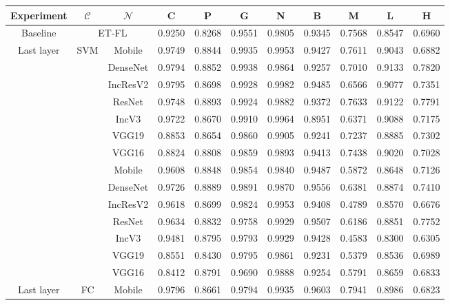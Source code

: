\begin{table}
  \centering
  \scriptsize
	\begin{tabular}{|c|c|c|ccccc|ccc|}
    \hline
    \textbf{Experiment} & $\mathcal{C}$ & $\mathcal{N}$ & \textbf{C} & \textbf{P} & \textbf{G} & \textbf{N} & \textbf{B} & \textbf{M} & \textbf{L} & \textbf{H} \\
    \hline
    Baseline & \multicolumn{2}{c|}{ET-FL} & 0.9250 & 0.8268 & 0.9551 & 0.9805 & 0.9345 & 0.7568 & 0.8547 & 0.6960 \\
    \hline
    \multirow{8}{*}{Last layer} & \multirow{8}{*}{SVM} & Mobile & 0.9749 & 0.8844 & 0.9935 & 0.9953 & 0.9427 & 0.7611 & 0.9043 & 0.6882 \\
    & & DenseNet & 0.9794 & 0.8852 & 0.9938 & 0.9864 & 0.9257 & 0.7010 & 0.9133 & 0.7820 \\
    & & IncResV2 & 0.9795 & 0.8698 & 0.9928 & 0.9982 & 0.9485 & 0.6566 & 0.9077 & 0.7351 \\
    & & ResNet & 0.9748 & 0.8893 & 0.9924 & 0.9882 & 0.9372 & 0.7633 & 0.9122 & 0.7791 \\
    & & IncV3 & 0.9722 & 0.8670 & 0.9910 & 0.9964 & 0.8951 & 0.6371 & 0.9088 & 0.7175 \\
    & & VGG19 & 0.8853 & 0.8654 & 0.9860 & 0.9905 & 0.9241 & 0.7237 & 0.8885 & 0.7302 \\
    & & VGG16 & 0.8824 & 0.8808 & 0.9859 & 0.9893 & 0.9413 & 0.7438 & 0.9020 & 0.7028 \\
    \hline
    \multirow{8}{*}{Last layer} & \multirow{8}{*}{ET} & Mobile & 0.9608 & 0.8848 & 0.9854 & 0.9840 & 0.9487 & 0.5872 & 0.8648 & 0.7126 \\
    & & DenseNet & 0.9726 & 0.8889 & 0.9891 & 0.9870 & 0.9556 & 0.6381 & 0.8874 & 0.7410 \\
    & & IncResV2 & 0.9618 & 0.8699 & 0.9824 & 0.9953 & 0.9408 & 0.4789 & 0.8570 & 0.6676 \\
    & & ResNet & 0.9634 & 0.8832 & 0.9758 & 0.9929 & 0.9507 & 0.6186 & 0.8851 & 0.7752 \\
    & & IncV3 & 0.9481 & 0.8795 & 0.9793 & 0.9929 & 0.9428 & 0.4583 & 0.8300 & 0.6305 \\
    & & VGG19 & 0.8551 & 0.8430 & 0.9795 & 0.9861 & 0.9231 & 0.5379 & 0.8536 & 0.6989 \\
    & & VGG16 & 0.8412 & 0.8791 & 0.9690 & 0.9888 & 0.9254 & 0.5791 & 0.8659 & 0.6833 \\
    \hline
    \multirow{8}{*}{Last layer} & \multirow{8}{*}{FC} & Mobile & 0.9796 & 0.8661 & 0.9794 & 0.9935 & 0.9603 & 0.7941 & 0.8986 & 0.6823 \\

\end{tabular}
\end{table}
